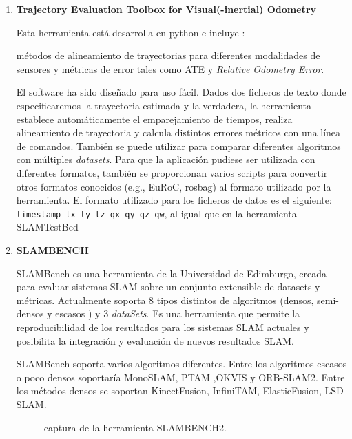 \begin {enumerate}


\item \textbf{Trajectory Evaluation Toolbox for Visual(-inertial) Odometry}

Esta herramienta está desarrolla en python e incluye : 

métodos de alineamiento de trayectorias para diferentes modalidades de sensores y métricas de error tales como ATE y \textit{Relative Odometry Error}. \cite{Zhang18iros}

El software ha sido diseñado para uso fácil. Dados dos ficheros de texto donde especificaremos la trayectoria estimada y la verdadera, la herramienta establece automáticamente el emparejamiento de tiempos, realiza alineamiento de trayectoria y calcula distintos errores métricos con una línea de comandos. También se puede utilizar para comparar diferentes algoritmos con múltiples \textit{datasets}. Para que la aplicación pudiese ser utilizada con diferentes formatos, también se proporcionan varios scripts para convertir otros formatos conocidos (e.g., EuRoC, rosbag) al formato utilizado por la herramienta.
El formato utilizado para los ficheros de datos es el siguiente: \texttt{timestamp tx ty tz qx qy qz qw}, al igual que en la herramienta SLAMTestBed

\item \textbf{SLAMBENCH}

SLAMBench es una herramienta de la Universidad de Edimburgo, creada para evaluar sistemas SLAM sobre un conjunto extensible de datasets y métricas. \cite{Bodin2018}
Actualmente soporta 8 tipos distintos de algoritmos (densos, semi-densos y escasos ) y 3 \textit{dataSets}. Es una herramienta que permite la reproducibilidad de los resultados para los sistemas SLAM actuales y posibilita la integración y evaluación de nuevos resultados SLAM.

SLAMBench soporta varios algoritmos diferentes. Entre los algoritmos escasos o poco densos soportaría MonoSLAM, PTAM ,OKVIS y ORB-SLAM2. Entre los métodos densos se soportan KinectFusion, InfiniTAM, ElasticFusion, LSD-SLAM.
\begin{figure}[H]
\begin{center}
\end{center}
\caption{captura de la herramienta SLAMBENCH2.}
\end{figure}


\end{enumerate}
